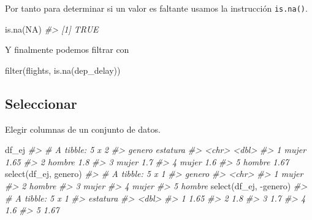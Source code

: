\documentclass[
]{book}
\newenvironment{Shaded}{\begin{snugshade}}{\end{snugshade}}
\newcommand{\CommentTok}[1]{\textcolor[rgb]{0.56,0.35,0.01}{\textit{#1}}}
\newcommand{\ConstantTok}[1]{\textcolor[rgb]{0.00,0.00,0.00}{#1}}
\newcommand{\FunctionTok}[1]{\textcolor[rgb]{0.00,0.00,0.00}{#1}}
\newcommand{\NormalTok}[1]{#1}
\newcommand{\SpecialCharTok}[1]{\textcolor[rgb]{0.00,0.00,0.00}{#1}}
\begin{document}
Por tanto para determinar si un valor es faltante usamos la instrucción
\texttt{is.na()}.

\begin{Shaded}
\begin{Highlighting}[]
\FunctionTok{is.na}\NormalTok{(}\ConstantTok{NA}\NormalTok{)}
\CommentTok{\#\textgreater{} [1] TRUE}
\end{Highlighting}
\end{Shaded}

Y finalmente podemos filtrar con

\begin{Shaded}
\begin{Highlighting}[]
\FunctionTok{filter}\NormalTok{(flights, }\FunctionTok{is.na}\NormalTok{(dep\_delay))}
\end{Highlighting}
\end{Shaded}

\hypertarget{seleccionar}{%
\subsection*{Seleccionar}\label{seleccionar}}

Elegir columnas de un conjunto de datos.

\begin{Shaded}
\begin{Highlighting}[]
\NormalTok{df\_ej}
\CommentTok{\#\textgreater{} \# A tibble: 5 x 2}
\CommentTok{\#\textgreater{}   genero estatura}
\CommentTok{\#\textgreater{}   \textless{}chr\textgreater{}     \textless{}dbl\textgreater{}}
\CommentTok{\#\textgreater{} 1 mujer      1.65}
\CommentTok{\#\textgreater{} 2 hombre     1.8 }
\CommentTok{\#\textgreater{} 3 mujer      1.7 }
\CommentTok{\#\textgreater{} 4 mujer      1.6 }
\CommentTok{\#\textgreater{} 5 hombre     1.67}
\FunctionTok{select}\NormalTok{(df\_ej, genero)}
\CommentTok{\#\textgreater{} \# A tibble: 5 x 1}
\CommentTok{\#\textgreater{}   genero}
\CommentTok{\#\textgreater{}   \textless{}chr\textgreater{} }
\CommentTok{\#\textgreater{} 1 mujer }
\CommentTok{\#\textgreater{} 2 hombre}
\CommentTok{\#\textgreater{} 3 mujer }
\CommentTok{\#\textgreater{} 4 mujer }
\CommentTok{\#\textgreater{} 5 hombre}
\FunctionTok{select}\NormalTok{(df\_ej, }\SpecialCharTok{{-}}\NormalTok{genero)}
\CommentTok{\#\textgreater{} \# A tibble: 5 x 1}
\CommentTok{\#\textgreater{}   estatura}
\CommentTok{\#\textgreater{}      \textless{}dbl\textgreater{}}
\CommentTok{\#\textgreater{} 1     1.65}
\CommentTok{\#\textgreater{} 2     1.8 }
\CommentTok{\#\textgreater{} 3     1.7 }
\CommentTok{\#\textgreater{} 4     1.6 }
\CommentTok{\#\textgreater{} 5     1.67}
\end{Highlighting}
\end{Shaded}
\end{document}
